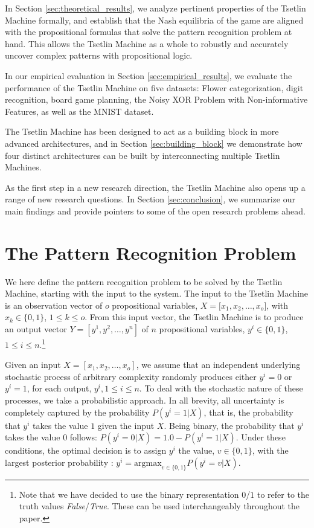 \documentclass[11pt,a4paper]{article}
\newcommand{\True}{\mbox{1}}
\newcommand{\False}{\mbox{0}}
\begin{document}
In Section \ref{sec:theoretical_results}, we analyze pertinent properties of the Tsetlin Machine formally, and establish that the Nash equilibria of the game are aligned with the propositional formulas that solve the pattern recognition problem at hand. This allows the Tsetlin Machine as a whole to robustly and accurately uncover complex patterns with propositional logic.

In our empirical evaluation in Section \ref{sec:empirical_results}, we evaluate the performance of the Tsetlin Machine on five datasets: Flower categorization, digit recognition, board game planning, the Noisy XOR Problem with Non-informative Features, as well as the MNIST dataset.

The Tsetlin Machine has been designed to act as a building block in more advanced architectures, and in Section \ref{sec:building_block} we demonstrate how four distinct architectures can be built by interconnecting multiple Tsetlin Machines.

As the first step in a new research direction, the Tsetlin Machine also opens up a range of new research questions. In Section \ref{sec:conclusion}, we summarize our main findings and provide pointers to some of the open research problems ahead.

\section{The Pattern Recognition Problem}
\label{sec:pattern_recognition_problem}

We here define the pattern recognition problem to be solved by the Tsetlin Machine, starting with the input to the system. The input to the Tsetlin Machine is an observation vector of $o$ propositional variables, $X = [x_1, x_2, \ldots, x_o$], with $x_k \in \{\False, \True\}$, $1 \le k \le o$. From this input vector, the Tsetlin Machine is to produce an output vector $Y = [y^1, y^2, \ldots, y^n]$ of $n$ propositional variables, $y^i \in \{\False, \True\}$, $1 \le i \le n$.\footnote{Note that we have decided to use the binary representation $\False$/$\True$ to refer to the truth values \emph{False}/\emph{True}. These can be used interchangeably throughout the paper.}

Given an input $X = [x_1, x_2, \ldots, x_o]$, we assume that an independent underlying stochastic process of arbitrary complexity randomly produces either $y^i = \False$ or $y^i = \True$, for each output, $y^i, 1 \le i \le n$. To deal with the stochastic nature of these processes, we take a probabilistic approach. In all brevity, all uncertainty is completely captured by the probability $P(y^i = \True | X)$, that is, the probability that $y^i$ takes the value $\True$ given the input $X$. Being binary, the probability that $y^i$ takes the value $\False$ follows: $P(y^i = \False | X) = 1.0 - P(y^i = \True | X)$. Under these conditions, the optimal decision is to assign $y^i$ the value, $v \in \{\False, \True\}$, with the largest posterior probability \cite{Duda2001}: $y^i = \mathrm{argmax}_{v \in \{\False, \True\}} P(y^i = v | X)$.
\end{document}

